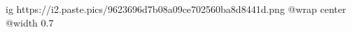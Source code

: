  
 
 
 
 

\ifcmt
  ig https://i2.paste.pics/9623696d7b08a09ce702560ba8d8441d.png
	@wrap center
	@width 0.7
\fi

